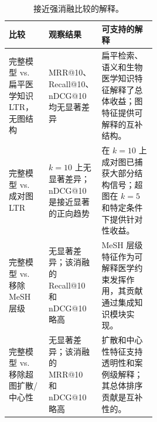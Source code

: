 \begin{table}[t]
\centering
\small
\caption{接近强消融比较的解释。}
\label{tab:strong-ablation-interpretation}
\begin{tabularx}{\linewidth}{p{0.27\linewidth}p{0.23\linewidth}X}
\toprule
比较 & 观察结果 & 可支持的解释 \\
\midrule
完整模型 vs. 扁平医学知识 LTR，无图结构 & MRR@10、Recall@10、nDCG@10 均无显著差异 & 扁平检索、语义和生物医学知识特征解释了总体收益；图特征提供可解释的互补结构。 \\
完整模型 vs. 成对图 LTR & $k=10$ 上无显著差异；nDCG@10 是接近显著的正向趋势 & 在 $k=10$ 上成对图已捕获大部分结构信号；超图在 $k=5$ 和特定条件下提供针对性收益。 \\
完整模型 vs. 移除 MeSH 层级 & 无显著差异；该消融的 Recall@10 和 nDCG@10 略高 & MeSH 层级特征作为可解释医学约束发挥作用，其贡献通过集成知识模块实现。 \\
完整模型 vs. 移除超图扩散/中心性 & 无显著差异；该消融的 MRR@10 和 nDCG@10 略高 & 扩散和中心性特征支持透明性和案例级解释；其总体排序贡献是互补性的。 \\
\bottomrule
\end{tabularx}
\end{table}
